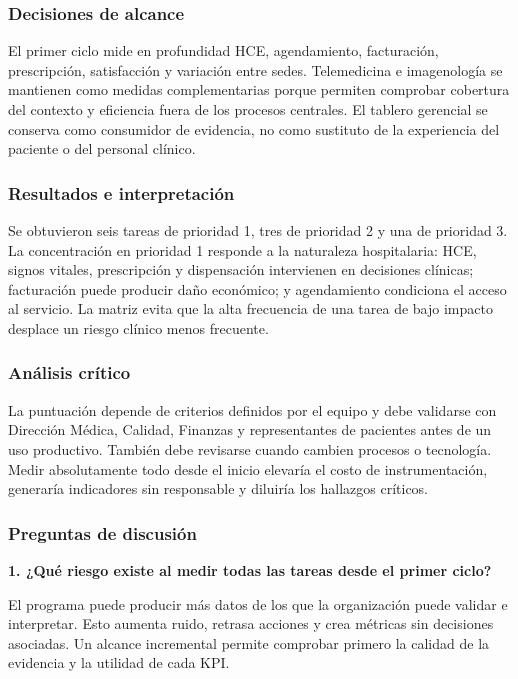 \subsubsection{Decisiones de alcance}

El primer ciclo mide en profundidad HCE, agendamiento, facturación, prescripción, satisfacción y variación entre sedes. Telemedicina e imagenología se mantienen como medidas complementarias porque permiten comprobar cobertura del contexto y eficiencia fuera de los procesos centrales. El tablero gerencial se conserva como consumidor de evidencia, no como sustituto de la experiencia del paciente o del personal clínico.

\subsubsection{Resultados e interpretación}

Se obtuvieron seis tareas de prioridad 1, tres de prioridad 2 y una de prioridad 3. La concentración en prioridad 1 responde a la naturaleza hospitalaria: HCE, signos vitales, prescripción y dispensación intervienen en decisiones clínicas; facturación puede producir daño económico; y agendamiento condiciona el acceso al servicio. La matriz evita que la alta frecuencia de una tarea de bajo impacto desplace un riesgo clínico menos frecuente.

\subsubsection{Análisis crítico}

La puntuación depende de criterios definidos por el equipo y debe validarse con Dirección Médica, Calidad, Finanzas y representantes de pacientes antes de un uso productivo. También debe revisarse cuando cambien procesos o tecnología. Medir absolutamente todo desde el inicio elevaría el costo de instrumentación, generaría indicadores sin responsable y diluiría los hallazgos críticos.

\subsubsection{Preguntas de discusión}

\textbf{1. ¿Qué riesgo existe al medir todas las tareas desde el primer ciclo?}

El programa puede producir más datos de los que la organización puede validar e interpretar. Esto aumenta ruido, retrasa acciones y crea métricas sin decisiones asociadas. Un alcance incremental permite comprobar primero la calidad de la evidencia y la utilidad de cada KPI.

